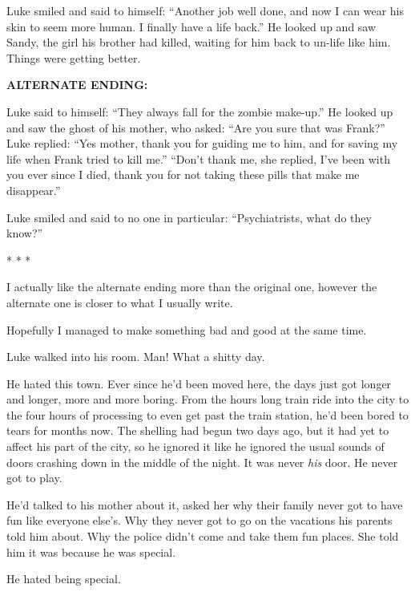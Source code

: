 Luke smiled and said to himself: ``Another job well done, and
now I can wear his skin to seem more human. I finally have a life
back.'' He looked up and saw Sandy, the girl his brother had
killed, waiting for him back to un-life like him. Things were
getting better.

{\bf ALTERNATE ENDING:}

Luke said to himself: ``They always fall for the zombie
make-up.'' He looked up and saw the ghost of his mother, who
asked: ``Are you sure that was Frank?'' Luke replied:
``Yes mother, thank you for guiding me to him, and for saving
my life when Frank tried to kill me.'' ``Don't
thank me, she replied, I've been with you ever since I died,
thank you for not taking these pills that make me
disappear.''

Luke smiled and said to no one in particular: ``Psychiatrists,
what do they know?''

* * *


I actually like the alternate ending more than the original one,
however the alternate one is closer to what I usually write.



Hopefully I managed to make something bad and good at the same
time. 
 





Luke walked into his room. Man! What a shitty day.



He hated this town. Ever since he'd been moved here, the days just
got longer and longer, more and more boring. From the hours long
train ride into the city to the four hours of processing to even
get past the train station, he'd been bored to tears for months
now. The shelling had begun two days ago, but it had yet to affect
his part of the city, so he ignored it like he ignored the usual
sounds of doors crashing down in the middle of the night. It was
never {\em his} door. He never got to play.



He'd talked to his mother about it, asked her why their family
never got to have fun like everyone else's. Why they never got to
go on the vacations his parents told him about. Why the police
didn't come and take them fun places. She told him it was because
he was special.



He hated being special.




